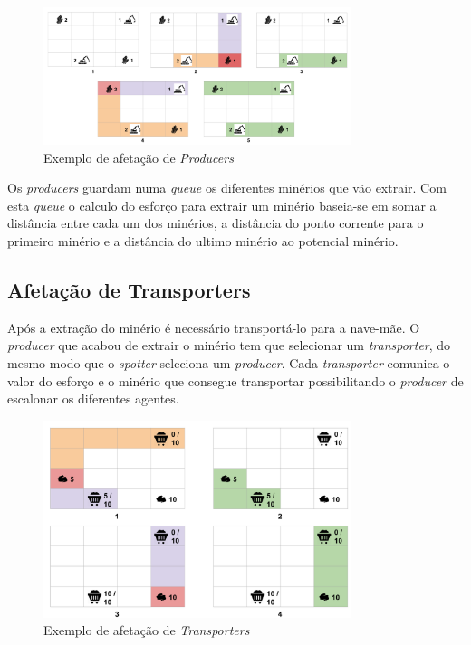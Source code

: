 \documentclass[12pt]{report}
\begin{document}
\begin{figure}[h]
  \centering
    \includegraphics[width=0.8\textwidth]{producer-scheduling}
  \caption{\small{Exemplo de afetação de \textit{Producers}}}
\end{figure}

Os \emph{producers} guardam numa \emph{queue} os diferentes minérios que vão extrair. Com esta \emph{queue} o calculo do esforço
para extrair um minério baseia-se em somar a distância entre cada um dos minérios, a distância do ponto corrente para o primeiro
minério e a distância do ultimo minério ao potencial minério.

\FloatBarrier
\newpage
\subsection{Afetação de Transporters}
Após a extração do minério é necessário transportá-lo para a nave-mãe. O \emph{producer} que acabou de extrair o minério tem que selecionar 
um \emph{transporter}, do mesmo modo que o \emph{spotter} seleciona um \emph{producer}. Cada \emph{transporter} comunica o valor
do esforço e o minério que consegue transportar possibilitando o \emph{producer} de escalonar os diferentes agentes.

\begin{figure}[h]
  \centering
    \includegraphics[width=0.8\textwidth]{transporter-scheduling}
  \caption{\small{Exemplo de afetação de \textit{Transporters}}}
\end{figure}
\end{document}
